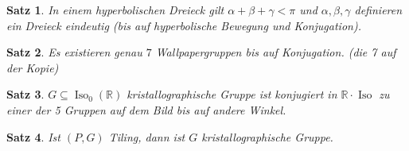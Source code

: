 \documentclass[ngerman,halfparskip]{scrartcl}
\newtheorem{satz}{Satz}
\def\R{\mathbb R}
\DeclareMathOperator{\Iso}{Iso}
\begin{document}
\begin{satz}
In einem hyperbolischen Dreieck gilt $\alpha+\beta+\gamma<\pi$ und $\alpha, \beta, \gamma$ definieren ein Dreieck eindeutig (bis auf hyperbolische Bewegung und Konjugation). 
\end{satz}


\begin{satz}
Es existieren genau $7$ Wallpapergruppen bis auf Konjugation. (die 7 auf der Kopie)
\end{satz}



\begin{satz}
$G\subseteq \Iso_0(\R)$ kristallographische Gruppe ist konjugiert in $\R\cdot\Iso$ zu einer der 5 Gruppen auf dem Bild bis auf andere Winkel.
\end{satz}


\begin{satz}
 Ist $(P,G)$ Tiling, dann ist $G$ kristallographische Gruppe.
\end{satz}
\end{document}
